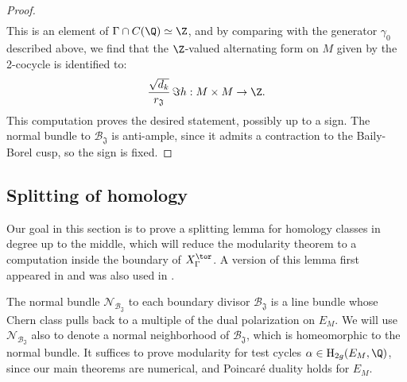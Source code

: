 \documentclass[11pt,letterpaper,english]{amsart}
\numberwithin{equation}{subsection}
\numberwithin{equation}{section}
\newcommand\cB{{\mathcal B}}
\newcommand\cN{{\mathcal N}}
\newcommand\cO{{\mathcal O}}
\newcommand\fJ{{\mathfrak J}}
\theoremstyle{plain}
\theoremstyle{remark}
\begin{document}
\begin{proof}
\begin{align*}
    \end{align*}
    This is an element of $\Gamma\cap C(\Q)\simeq \Z$, and by comparing with the generator $\gamma_0$ described above, we find that the $\Z$-valued alternating form on $M$ given by the 2-cocycle is identified to:
    \begin{align}\label{eq:chern-normal-bundle}\frac{\sqrt{d_k}}{r_\fJ}\, \Im h: M\times M \to \Z.\end{align}
    This computation proves the desired statement, possibly up to a sign.
    The normal bundle to $\cB_{\mathfrak J}$ is anti-ample, since it admits a contraction to the Baily-Borel cusp, so the sign is fixed.

    

\end{proof}
 




\subsection{Splitting of homology}\label{splitting}

Our goal in this section is to prove a splitting lemma for homology classes in degree up to the middle, which will reduce the modularity theorem to a computation inside the boundary of $X_\Gamma^\tor$. A version of this lemma first appeared in \cite{greer-advances} and was also used in \cite{engel-greer-tayou}.

The normal bundle $\mathcal N_{\cB_{\mathfrak{J}}}$ to each boundary divisor $\cB_{\mathfrak J}$ is a line bundle whose Chern class pulls back to a multiple of the dual polarization on $E_M$. We will use $\mathcal N_{\cB_{\mathfrak J}}$ also to denote a normal neighborhood of $\cB_{\mathfrak J}$, which is homeomorphic to the normal bundle. It suffices to prove modularity for test cycles $\alpha\in \mathrm{H}_{2g}(E_M,\Q)$, since our main theorems are numerical, and Poincar\'{e} duality holds for $E_M$.
\end{document}
